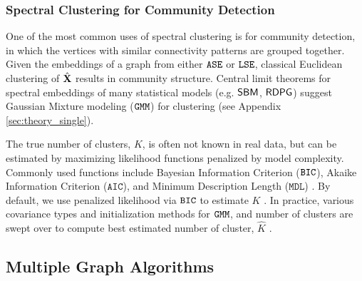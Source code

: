 \subsubsection{Spectral Clustering for Community Detection} \label{sec:clustering_single}
One of the most common uses of spectral clustering is for community detection, in which the vertices with similar connectivity patterns are grouped together. Given the embeddings of a graph from either $\operatorname{\mathtt{ASE}}$ or $\operatorname{\mathtt{LSE}}$, classical Euclidean clustering of $\hat{\operatorname{\mathbf{X}}}$ results in community structure. Central limit theorems for spectral embeddings of many statistical models (e.g. $\operatorname{\mathsf{SBM}}$, $\operatorname{\mathsf{RDPG}}$) suggest Gaussian Mixture modeling ($\operatorname{\mathtt{GMM}}$) for clustering (see Appendix \ref{sec:theory_single}).

The true number of clusters, $K$, is often not known in real data, but can be estimated by maximizing likelihood functions penalized by model complexity. Commonly used functions include Bayesian Information Criterion ($\operatorname{\mathtt{BIC}}$), Akaike Information Criterion ($\mathtt{AIC}$), and Minimum Description Length ($\mathtt{MDL}$) \cite{akaike1974new, schwarz1978estimating, rissanen1978modeling}. By default, we use penalized likelihood via $\operatorname{\mathtt{BIC}}$ to estimate $K$ \cite{priebe2019two}. In practice, various covariance types and initialization methods for $\operatorname{\mathtt{GMM}}$, and number of clusters are swept over to compute best estimated number of cluster, $\hat K$ \cite{athey2019autogmm, scrucca2016mclust}.


\subsection{Multiple Graph Algorithms}\label{sec:multi_algo}
